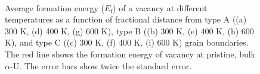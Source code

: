 \documentclass[review]{elsarticle}
\begin{document}
\begin{figure}[h!]
\\
\caption{ Average formation energy ($E_{\mathrm{f}}$) of a vacancy at different temperatures as a function of fractional distance from type A ((a) 300 K, (d) 400 K, (g) 600 K), type B ((b) 300 K, (e) 400 K, (h) 600 K), and type C ((c) 300 K, (f) 400 K, (i) 600 K) grain boundaries. The red line shows the formation energy of vacancy at pristine, bulk $\alpha$-U. The error bars show twice the standard error.}
\label{fig:Seg_vacancy}
\end{figure}
\newpage
\end{document}

